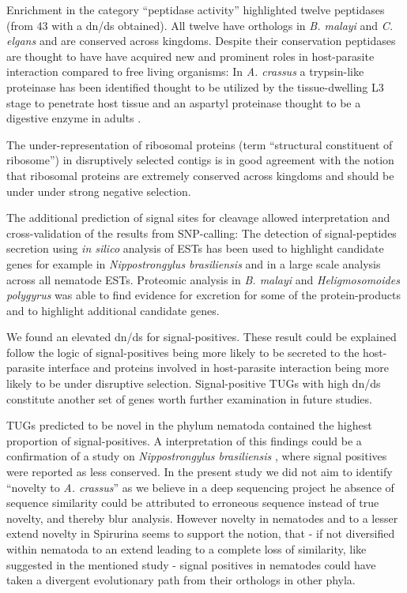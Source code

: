 \documentclass[10pt]{bmc_article}
\newenvironment{bmcformat}{\begin{raggedright}\baselineskip20pt\sloppy\setboolean{publ}{false}}{\end{raggedright}\baselineskip20pt\sloppy}
\begin{document}
\begin{bmcformat}
Enrichment in the category ``peptidase activity'' highlighted twelve
peptidases (from 43 with a dn/ds obtained). All twelve have orthologs
in \textit{B. malayi} and \textit{C. elgans} and are conserved across
kingdoms. Despite their conservation peptidases are thought to have
have acquired new and prominent roles in host-parasite interaction
compared to free living organisms: In \textit{A. crassus} a
trypsin-like proteinase has been identified thought to be utilized by
the tissue-dwelling L3 stage to penetrate host tissue and an aspartyl
proteinase thought to be a digestive enzyme in adults
\cite{polzer_identification_1993}.

The under-representation of ribosomal proteins (term ``structural
constituent of ribosome'') in disruptively selected contigs is in good
agreement with the notion that ribosomal proteins are extremely
conserved across kingdoms \cite{pmid9664699} and should be under under
strong negative selection. 

The additional prediction of signal sites for cleavage allowed
interpretation and cross-validation of the results from SNP-calling:
The detection of signal-peptides secretion using \textit{in silico}
analysis of ESTs has been used to highlight candidate genes for
example in \textit{Nippostrongylus brasiliensis}
\cite{harcus_signal_2004} and in a large scale analysis across all
nematode \cite{nagaraj_needles_2008} ESTs. Proteomic analysis in
\textit{B. malayi} \cite{pmid19352421,pmid18958170} and
\textit{Heligmosomoides polygyrus} \cite{pmid21722761} was able to
find evidence for excretion for some of the protein-products and to
highlight additional candidate genes.

We found an elevated dn/ds for signal-positives. These result could be
explained follow the logic of signal-positives being more likely to be
secreted to the host-parasite interface and proteins involved in
host-parasite interaction being more likely to be under disruptive
selection. Signal-positive TUGs with high dn/ds constitute another set
of genes worth further examination in future studies.

TUGs predicted to be novel in the phylum nematoda contained the
highest proportion of signal-positives. A interpretation of this
findings could be a confirmation of a study on \textit{Nippostrongylus
  brasiliensis} \cite{harcus_signal_2004}, where signal positives were
reported as less conserved. In the present study we did not aim to
identify ``novelty to \textit{A. crassus}'' as we believe in a deep
sequencing project he absence of sequence similarity could be
attributed to erroneous sequence instead of true novelty, and thereby
blur analysis. However novelty in nematodes and to a lesser extend
novelty in Spirurina seems to support the notion, that - if not
diversified within nematoda to an extend leading to a complete loss of
similarity, like suggested in the mentioned study - signal positives
in nematodes could have taken a divergent evolutionary path from their
orthologs in other phyla.


\end{bmcformat}
\end{document}
